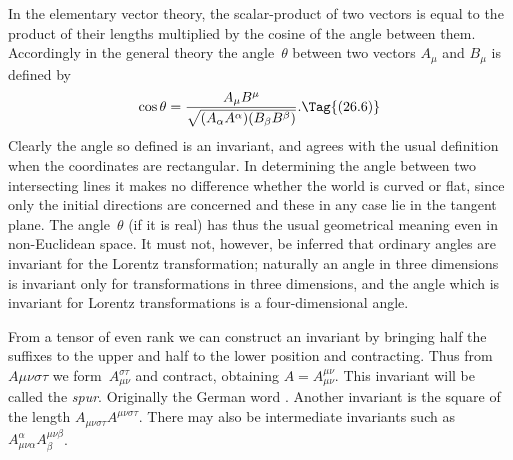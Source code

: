 \documentclass[12pt]{book}
\begin{document}
In the elementary vector theory, the scalar-product of two vectors is
equal to the product of their lengths multiplied by the cosine of the angle
%
between them. Accordingly in the general theory the angle~$\theta$ between two
vectors $A_{\mu}$ and $B_{\mu}$ is defined by
\[
\cos\theta = \frac{A_{\mu} B^{\mu}}{\sqrt{(A_{\alpha} A^{\alpha}) (B_{\beta} B^{\beta})}}.
\Tag{(26.6)}
\]
Clearly the angle so defined is an invariant, and agrees with the usual
%
definition when the coordinates are rectangular. In determining the angle
between two intersecting lines it makes no difference whether the world is
curved or flat, since only the initial directions are concerned and these in any
case lie in the tangent plane. The angle~$\theta$ (if it is real) has thus the usual
geometrical meaning even in non-Euclidean space. It must not, however, be
inferred that ordinary angles are invariant for the Lorentz transformation;
naturally an angle in three dimensions is invariant only for transformations
in three dimensions, and the angle which is invariant for Lorentz transformations
is a four-dimensional angle.

From a tensor of even rank we can construct an invariant by bringing
half the suffixes to the upper and half to the lower position and contracting.
Thus from~$A{\mu\nu\sigma\tau}$ we form~$A_{\mu\nu}^{\sigma\tau}$ and contract, obtaining $A = A_{\mu\nu}^{\mu\nu}$. This invariant
will be called the \emph{spur}\footnotemark.\footnotetext
  {Originally the German word .}
Another invariant is the square of the
%
length $A_{\mu\nu\sigma\tau} A^{\mu\nu\sigma\tau}$. There may also be intermediate invariants such as
$A_{\mu\nu\alpha}^{\alpha} A_{\beta}^{\mu\nu\beta}$.

%
%
\end{document}
